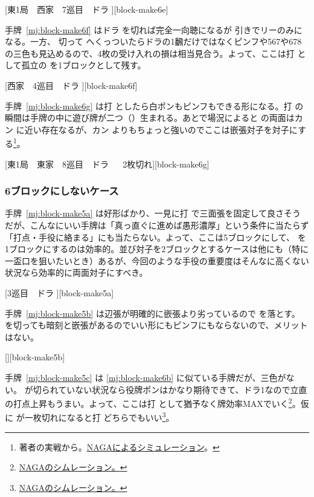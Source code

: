\documentclass[../nankiru_main.tex]{subfiles}
\begin{document}
[東1局　西家　7巡目　ドラ ][block-make6e]

手牌~\ref{mj:block-make6f} はドラ  を切れば完全一向聴になるが  引きでリーのみになる。一方、 切って  へくっついたらドラの1飜だけではなくピンフや567や678の三色も見込めるので、4枚の受け入れの損は相当見合う。よって、ここは打  として孤立の  を1ブロックとして残す\citep[][pp.~34--39]{tetsusenryaku}。

[西家　4巡目　ドラ ][block-make6f]

手牌~\ref{mj:block-make6g} は打  としたら白ポンもピンフもできる形になる。打  の瞬間は手牌の中に遊び牌が二つ（）生まれる。あとで場況によると  の両面はカン  に近い存在なるが、カン  よりもちょっと強いのでここは嵌張対子を対子にする\footnote{著者の実戦から。\href{https://naga.dmv.nico/htmls/a9406974a7b3ea23b524861a4b2d51b414ced3b15aabb06771630d0cc5a57582v2_2.html?tw=0}{NAGAによるシミュレーション}。}。

[東1局　東家　8巡目　ドラ 　 2枚切れ][block-make6g]


\subsubsection*{6ブロックにしないケース}

手牌~\ref{mj:block-make5a} は好形ばかり、一見に打  で三面張を固定して良さそうだが、こんなにいい手牌は「真っ直ぐに進めば愚形濃厚」という条件に当たらず「打点・手役に絡まる」にも当たらない。よって、ここは5ブロックにして、 を1ブロックにするのは効率的\citep[][pp.~40--41]{fkt}。並び対子を2ブロックとするケースは他にも（特に一盃口を狙いたいとき）あるが、今回のような手役の重要度はそんなに高くない状況なら効率的に両面対子にすべき。

[3巡目　ドラ ][block-make5a]

手牌~\ref{mj:block-make5b} は辺張が明確的に嵌張より劣っているので  を落とす\citep[][p. 21]{ishibashi-black}。 を切っても暗刻と嵌張があるのでいい形にもピンフにもならないので、メリットはない。

[][block-make5b]

手牌~\ref{mj:block-make5c} は \ref{mj:block-make6b} に似ている手牌だが、三色がない。 が切られていない状況なら役牌ポンはかなり期待できて、ドラ1なので立直の打点上昇もうまい。よって、ここは打  として猶予なく牌効率MAXでいく\footnote{\href{https://naga.dmv.nico/htmls/ec787520089288c78a2ebf7125ac2f91df48e904a0e5265dc7bb7b3c78b0ceb3v2_2.html?tw=2}{NAGAのシムレーション。}}。仮に  が一枚切れになると打  どちらでもいい\footnote{\href{https://naga.dmv.nico/htmls/164b034647561018b05affe211de32c2665ce7ab3cf4accdbc05cf0902d25f2dv2_2.html?tw=2}{NAGAのシムレーション。}}。
\end{document}
